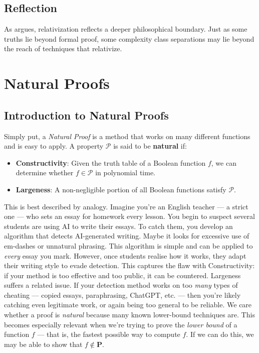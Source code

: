 \documentclass[12pt]{report}
\begin{document}
\section{Reflection}
As \cite{aaronson2005philosophers} argues, relativization reflects a deeper philosophical boundary.
Just as some truths lie beyond formal proof, some complexity class separations may lie beyond the reach of techniques that relativize.

\newpage
\chapter{Natural Proofs}
\section{Introduction to Natural Proofs}
Simply put, a \textit{Natural Proof} is a method that works on many different functions and is easy to apply.  
A property $\mathcal{P}$ is said to be \textbf{natural} if:
\begin{itemize}
    \item \textbf{Constructivity}: Given the truth table of a Boolean function $f$, we can determine whether $f \in \mathcal{P}$ in polynomial time.
    \item \textbf{Largeness}: A non-negligible portion of all Boolean functions satisfy $\mathcal{P}$.
\end{itemize}
This is best described by analogy.  
Imagine you're an English teacher --- a strict one --- who sets an essay for homework every lesson. You begin to suspect several students are using AI to write their essays.  
To catch them, you develop an algorithm that detects AI-generated writing. Maybe it looks for excessive use of em-dashes or unnatural phrasing.
This algorithm is simple and can be applied to \textit{every} essay you mark.  
However, once students realise how it works, they adapt their writing style to evade detection.  
This captures the flaw with Constructivity: if your method is too effective and too public, it can be countered.
Largeness suffers a related issue. If your detection method works on too \textit{many} types of cheating --- copied essays, paraphrasing, ChatGPT, etc. --- then you're likely catching even legitimate work, or again being too general to be reliable.
\vspace{1cm}
\newline
We care whether a proof is \textit{natural} because many known lower-bound techniques are.  
This becomes especially relevant when we're trying to prove the \textit{lower bound} of a function $f$ --- that is, the fastest possible way to compute $f$.  
If we can do this, we may be able to show that $f \notin \mathbf{P}$.
\end{document}
